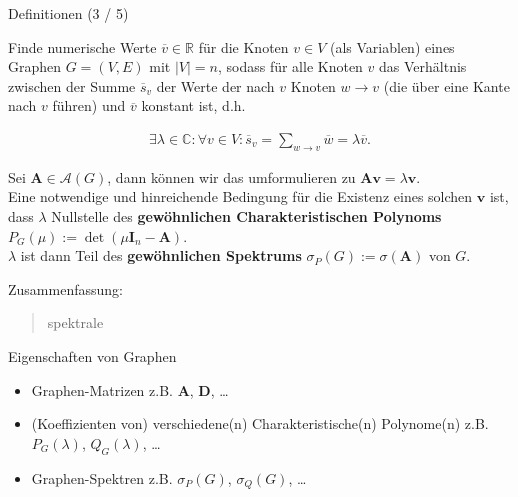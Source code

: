 \documentclass[aspectratio=169]{beamer}
\begin{document}
\begin{frame}{Definitionen (3 / 5)}
    
    \begin{definition*}
        
        Finde numerische Werte $\overline v \in \mathbb R$ für die Knoten $v \in V$ (als Variablen) eines Graphen $G = (V, E)$ mit $|V| = n$, sodass für alle Knoten $v$ das Verhältnis zwischen der Summe $\overline s_v$ der Werte der nach $v$ Knoten $w \to v$ (die über eine Kante nach $v$ führen) und $\overline v$ konstant ist, d.h.
    
        \begin{align*}
            \exists \lambda \in \mathbb C:
                \forall v \in V:
                    \overline s_v = \sum_{w \to v} \overline w = \lambda \overline v.
        \end{align*}
    
        Sei $\mathbf A \in \mathcal A(G)$, dann können wir das umformulieren zu $\mathbf A \mathbf v = \lambda \mathbf v$. \\
        Eine notwendige und hinreichende Bedingung für die Existenz eines solchen $\mathbf v$ ist, dass $\lambda$ Nullstelle des \textbf{gewöhnlichen Charakteristischen Polynoms} $P_G(\mu) := \det(\mu \mathbf I_n - \mathbf A)$. \\
        $\lambda$ ist dann Teil des \textbf{gewöhnlichen Spektrums} $\sigma_P(G) := \sigma(\mathbf A)$ von $G$.

    \end{definition*}

\end{frame}

\begin{frame}{Zusammenfassung: \blockquote{spektrale} Eigenschaften von Graphen}

    \begin{block}{}

        \begin{itemize}
            \item Graphen-Matrizen z.B. $\mathbf A$, $\mathbf D$, \dots
            \item (Koeffizienten von) verschiedene(n) Charakteristische(n) Polynome(n) z.B. $P_G(\lambda)$, $Q_G(\lambda)$, \dots
            \item Graphen-Spektren z.B. $\sigma_P(G)$, $\sigma_Q(G)$, \dots
        \end{itemize}

    \end{block}

\end{frame}
\end{document}
